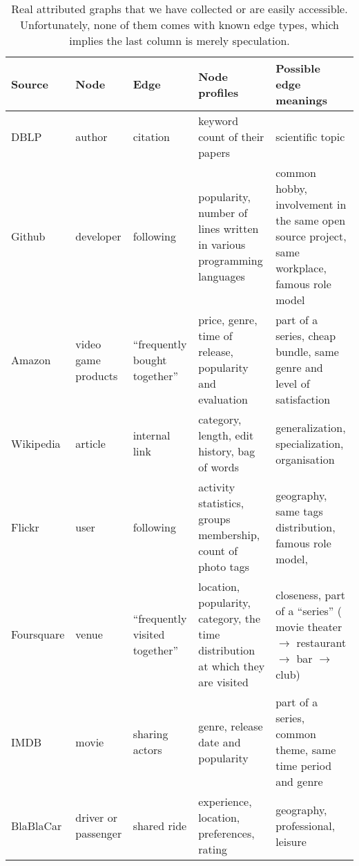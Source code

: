 \setlength{\fullpage}{179mm}
\begin{table}[h]
\begin{adjustwidth}{-2cm}{}
  \small
  \setlength{\tabcolsep}{4pt}
  \centering
  \caption[Real world attributed graphs]{Real attributed graphs that we have collected or are easily accessible. Unfortunately,
    none of them comes with known edge types, which implies the last column is merely speculation.
  \label{tab:edge_apps}}
  {\renewcommand{\arraystretch}{0.95}%
  \begin{tabulary}{\fullpage}{lLLLL}
    \toprule
    {Source} & {Node} & {Edge} & {Node profiles} & {Possible edge meanings} \\
    \midrule
    DBLP & author & citation & keyword count of their papers & scientific topic \\
    Github & developer & following & popularity, number of lines written in various programming languages &
    common hobby, involvement in the same open source project, same
    workplace, famous role model \\
    Amazon & video game products & \enquote{frequently bought together} & price, genre, time of release, popularity and evaluation &
    part of a series, cheap bundle, same genre and level of satisfaction \\
    Wikipedia & article & internal link & category, length, edit history, bag of words &
    generalization, specialization, organisation \\
    Flickr & user & following & activity statistics, groups membership, count of photo tags &
    geography, same tags distribution, famous role model,  \\ 
    Foursquare & venue & \enquote{frequently visited together} & location, popularity, category, the time distribution at which they are visited &
    closeness, part of a \enquote{series} (\eg{} movie theater $\rightarrow$ restaurant $\rightarrow$
    bar $\rightarrow$ club) \\
    IMDB & movie & sharing actors & genre, release date and popularity &
    part of a series, common theme, same time period and genre \\
    BlaBlaCar & driver or passenger & shared ride & experience, location, preferences, rating &
    geography, professional, leisure \\
    \bottomrule
  \end{tabulary}}
\end{adjustwidth}
\end{table}

